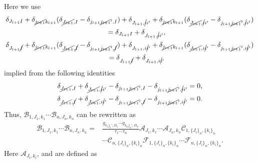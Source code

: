 \documentclass[pdftex]{sigma}
\numberwithin{equation}{section}
\begin{document}
Here we use
\begin{gather*}
 \delta_{J_{l+1}I}
 +
 \delta_{\cancel{j_{l+1}}k_{l+1}}
 (
 \delta_{\cancel{J_{l+1}},I}
 -
 \delta_{j_{l+1}\cancel{j_{l+1}}',I}
 )
 +
 \delta_{J_{l+1},\cancel{i}i'}
 +
 \delta_{\cancel{j_{l+1}}k_{l+1}}
 (
 \delta_{\cancel{J_{l+1}},\cancel{i}i'}
 -
 \delta_{j_{l+1}\cancel{j_{l+1}}',\cancel{i}i'}
 )\\
 \qquad
 =
 \delta_{J_{l+1}I}
 +
 \delta_{J_{l+1},\cancel{i}i'},
 \\
 \delta_{J_{l+1}\cancel{I}}
 +
 \delta_{\cancel{j_{l+1}}k_{l+1}}
 (
 \delta_{\cancel{J_{l+1}},\cancel{I}}
 -
 \delta_{j_{l+1}\cancel{j_{l+1}}',\cancel{I}}
 )
 +
 \delta_{J_{l+1},i\cancel{i}'}
 +
 \delta_{\cancel{j_{l+1}}k_{l+1}}
 (
 \delta_{\cancel{J_{l+1}},i\cancel{i}'}
 -
 \delta_{j_{l+1}\cancel{j_{l+1}}',i\cancel{i}'}
 )\\
 \qquad
 =
 \delta_{J_{l+1}\cancel{I}}
 +
 \delta_{J_{l+1},i\cancel{i}'}
\end{gather*}
implied from the following identities
\begin{align*}
 \delta_{\cancel{J_{l+1}},I}
 +
 \delta_{\cancel{J_{l+1}},\cancel{i}i'}
 -
 \delta_{j_{l+1}\cancel{j_{l+1}}',I}
 -
 \delta_{j_{l+1}\cancel{j_{l+1}}',\cancel{i}i'}
 &=
 0,
 \\
 \delta_{\cancel{J_{l+1}},\cancel{I}}
 +
 \delta_{\cancel{J_{l+1}},i\cancel{i}'}
 -
 \delta_{j_{l+1}\cancel{j_{l+1}}',\cancel{I}}
 -
 \delta_{j_{l+1}\cancel{j_{l+1}}',i\cancel{i}'}
 &=
 0.
\end{align*}
\noindent
Thus,
$
\mathcal{B}_{
1,
J_{1},
k_{1}
}
\cdots
\mathcal{B}_{
n,
J_{n},
k_{n}
}
$
can be rewritten as
\begin{align*}
\mathcal{B}_{
1,
J_{1},
k_{1}
}
\cdots
\mathcal{B}_{
n,
J_{n},
k_{n}
}
={}&
\frac{
 g_{\overline{k_{1}{j_{1}}'},D_{1}}
 \cdots
 g_{\overline{k_{n}{j_{n}}'},D_{n}}
}{
 \tau_{1}
 \cdots
 \tau_{n}
}
\mathcal{A}_{
J_{1},
k_{1}
}
\cdots
\mathcal{A}_{
J_{n},
k_{n}
}
\mathcal{C}_{
1,
\{
 J_{i}
\}_{n},
\{
 k_{i}
\}_{n}
}\\
&
\cdots
\mathcal{C}_{
n,
\{
 J_{i}
\}_{n},
\{
 k_{i}
\}_{n}
}
\mathcal{F}_{
1,
\{
 J_{i}
\}_{n},
\{
 k_{i}
\}_{n}
}
\cdots
\mathcal{F}_{
n,
\{
 J_{i}
\}_{n},
\{
 k_{i}
\}_{n}
}
.
\end{align*}
Here
$
\mathcal{A}_{
J_{l},
k_{l}
}
$,
and
are defined as
\end{document}
